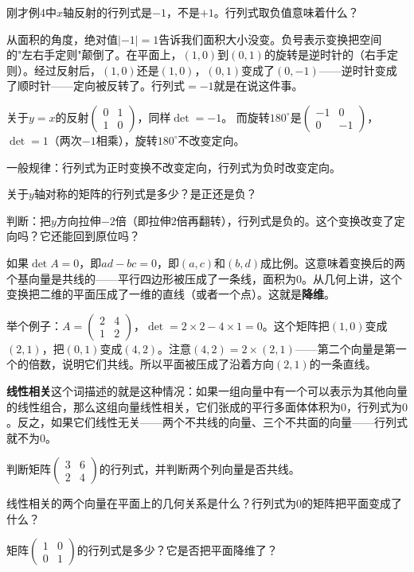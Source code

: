 \documentclass[a4paper,12pt]{ctexart}
\begin{document}

刚才例4中$x$轴反射的行列式是$-1$，不是$+1$。行列式取负值意味着什么？

从面积的角度，绝对值$|-1|=1$告诉我们面积大小没变。负号表示变换把空间的"左右手定则"颠倒了。在平面上，$(1,0)$到$(0,1)$的旋转是逆时针的（右手定则）。经过反射后，$(1,0)$还是$(1,0)$，$(0,1)$变成了$(0,-1)$——逆时针变成了顺时针——定向被反转了。行列式$=-1$就是在说这件事。

关于$y=x$的反射$\begin{pmatrix}0&1\\1&0\end{pmatrix}$，同样$\det=-1$。
而旋转$180^\circ$是$\begin{pmatrix}-1&0\\0&-1\end{pmatrix}$，$\det=1$（两次$-1$相乘），旋转$180^\circ$不改变定向。

一般规律：行列式为正时变换不改变定向，行列式为负时改变定向。

\begin{exercise}[负行列式练习]
\item 关于$y$轴对称的矩阵的行列式是多少？是正还是负？
\item 判断：把$y$方向拉伸$-2$倍（即拉伸$2$倍再翻转），行列式是负的。这个变换改变了定向吗？它还能回到原位吗？
\end{exercise}


如果$\det A=0$，即$ad-bc=0$，即$(a,c)$和$(b,d)$成比例。这意味着变换后的两个基向量是共线的——平行四边形被压成了一条线，面积为$0$。从几何上讲，这个变换把二维的平面压成了一维的直线（或者一个点）。这就是\textbf{降维}。

举个例子：$A=\begin{pmatrix}2&4\\1&2\end{pmatrix}$，$\det=2\times2-4\times1=0$。这个矩阵把$(1,0)$变成$(2,1)$，把$(0,1)$变成$(4,2)$。注意$(4,2)=2\times(2,1)$——第二个向量是第一个的倍数，说明它们共线。所以平面被压成了沿着方向$(2,1)$的一条直线。

\textbf{线性相关}这个词描述的就是这种情况：如果一组向量中有一个可以表示为其他向量的线性组合，那么这组向量线性相关，它们张成的平行多面体体积为$0$，行列式为$0$。反之，如果它们线性无关——两个不共线的向量、三个不共面的向量——行列式就不为$0$。

\begin{exercise}[行列式为0练习]
\item 判断矩阵$\begin{pmatrix}3&6\\2&4\end{pmatrix}$的行列式，并判断两个列向量是否共线。
\item 线性相关的两个向量在平面上的几何关系是什么？行列式为$0$的矩阵把平面变成了什么？
\item 矩阵$\begin{pmatrix}1&0\\0&1\end{pmatrix}$的行列式是多少？它是否把平面降维了？
\end{exercise}
\end{document}
